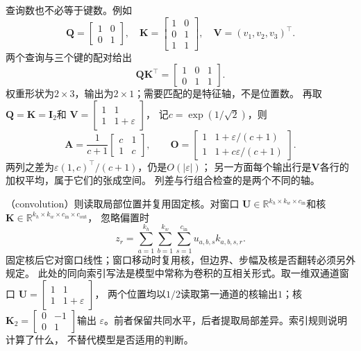 查询数也不必等于键数。例如
\[
 \bm Q=\begin{bmatrix}1&0\\0&1\end{bmatrix},\quad
 \bm K=\begin{bmatrix}1&0\\0&1\\1&1\end{bmatrix},\quad
 \bm V=(v_1,v_2,v_3)^\top.
\]
两个查询与三个键的配对给出
\[
 \bm Q\bm K^\top=\begin{bmatrix}1&0&1\\0&1&1\end{bmatrix}.
\]
权重形状为$2\times3$，输出为$2\times1$；需要匹配的是特征轴，不是位置数。
再取$\bm Q=\bm K=\bm I_2$和
$\bm V=\left[\begin{smallmatrix}1&1\\1&1+\varepsilon\end{smallmatrix}\right]$，
记$c=\exp(1/\sqrt2)$，则
\[
 \bm A=\frac1{c+1}\begin{bmatrix}c&1\\1&c\end{bmatrix},\qquad
 \bm O=\begin{bmatrix}
 1&1+\varepsilon/(c+1)\\1&1+c\varepsilon/(c+1)
 \end{bmatrix}.
\]
两列之差为$\varepsilon(1,c)^\top/(c+1)$，仍是$O(|\varepsilon|)$；
另一方面每个输出行是$\bm V$各行的加权平均，属于它们的张成空间。
列差与行组合检查的是两个不同的轴。

（convolution）则读取局部位置并复用固定核。对窗口
$\bm U\in\mathbb R^{k_h\times k_w\times c_{\mathrm{in}}}$和核
$\bm K\in\mathbb R^{k_h\times k_w\times c_{\mathrm{in}}\times c_{\mathrm{out}}}$，
忽略偏置时
\begin{equation}
 z_r=\sum_{a=1}^{k_h}\sum_{b=1}^{k_w}\sum_{s=1}^{c_{\mathrm{in}}}
 u_{a,b,s}k_{a,b,s,r}.
 \label{eq:linear-algebra-convolution-window-contraction}
\end{equation}
固定核后它对窗口线性；窗口移动时复用核，但边界、步幅及核是否翻转必须另外规定。
此处的同向索引写法是模型中常称为卷积的互相关形式。取一维双通道窗口
$\bm U=\left[\begin{smallmatrix}1&1\\1&1+\varepsilon\end{smallmatrix}\right]$，
两个位置均以$1/2$读取第一通道的核输出$1$；核
$\bm K_2=\left[\begin{smallmatrix}0&-1\\0&1\end{smallmatrix}\right]$输出
$\varepsilon$。前者保留共同水平，后者提取局部差异。索引规则说明计算了什么，
不替代模型是否适用的判断。

